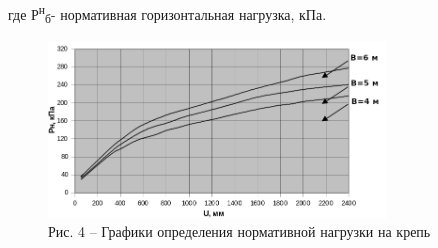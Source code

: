 где Р\textsuperscript{н}\textsubscript{б}- нормативная горизонтальная
нагрузка, кПа.

\begin{figure}[H]
	\centering
	\includegraphics[width=0.8\textwidth]{assets/1360}
	\caption*{Рис. 4 -- Графики определения нормативной нагрузки на крепь}
\end{figure}

